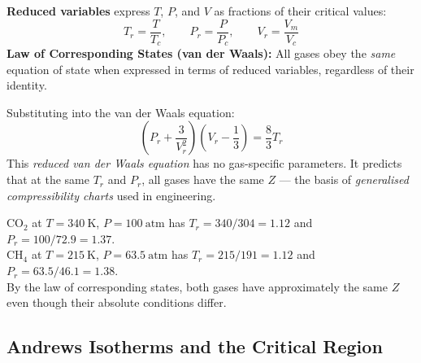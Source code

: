 \documentclass[12pt,a4paper]{article}
\begin{document}
\begin{tcolorbox}[defbox]
\textbf{Reduced variables} express $T$, $P$, and $V$ as fractions of their critical values:
\[
T_r = \frac{T}{T_c}, \qquad P_r = \frac{P}{P_c}, \qquad V_r = \frac{V_m}{V_c}
\]
\textbf{Law of Corresponding States (van der Waals):} All gases obey the \emph{same} equation of state when expressed in terms of reduced variables, regardless of their identity.
\end{tcolorbox}

Substituting into the van der Waals equation:
\[
\left(P_r + \frac{3}{V_r^2}\right)\!\left(V_r - \frac{1}{3}\right) = \frac{8}{3}T_r
\]
This \emph{reduced van der Waals equation} has no gas-specific parameters. It predicts that at the same $T_r$ and $P_r$, all gases have the same $Z$ --- the basis of \emph{generalised compressibility charts} used in engineering.

\begin{tcolorbox}[examplebox, title={Application: Comparing States of Different Gases}]
$\mathrm{CO_2}$ at $T=340\ \mathrm{K}$, $P=100\ \mathrm{atm}$ has $T_r=340/304=1.12$ and $P_r=100/72.9=1.37$.\\
$\mathrm{CH_4}$ at $T=215\ \mathrm{K}$, $P=63.5\ \mathrm{atm}$ has $T_r=215/191=1.12$ and $P_r=63.5/46.1=1.38$.\\
By the law of corresponding states, both gases have approximately the same $Z$ even though their absolute conditions differ.
\end{tcolorbox}

\subsection{Andrews Isotherms and the Critical Region}
\end{document}
